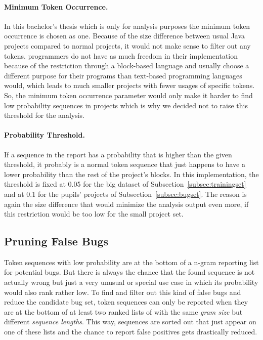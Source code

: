 \paragraph{Minimum Token Occurrence.}
In this bachelor's thesis \ngram{} which is only for \scratch{} analysis purposes the minimum token occurrence is chosen as one. Because of the size difference between usual Java projects compared to normal \scratch{} projects, it would not make sense to filter out any tokens. \scratch{} programmers do not have as much freedom in their implementation because of the restriction through a block-based language and usually choose a different purpose for their programs than text-based programming languages would, which leads to much smaller projects with fewer usages of specific tokens. So, the minimum token occurrence parameter would only make it harder to find low probability sequences in projects which is why we decided not to raise this threshold for the analysis.
\paragraph{Probability Threshold.}
If a sequence in the report has a probability that is higher than the given threshold, it probably is a normal token sequence that just happens to have a lower probability than the rest of the project's blocks. In this implementation, the threshold is fixed at 0.05 for the big dataset of Subsection~\ref{subsec:trainingset} and at 0.1 for the pupils' projects of Subsection~\ref{subsec:bugset}. The reason is again the size difference that would minimize the analysis output even more, if this restriction would be too low for the small project set.

\subsection{Pruning False Bugs}\label{subsec:false_bugs}
Token sequences with low probability are at the bottom of a n-gram reporting list for potential bugs. But there is always the chance that the found sequence is not actually wrong but just a very unusual or special use case in which its probability would also rank rather low. To find and filter out this kind of false bugs and reduce the candidate bug set, token sequences can only be reported when they are at the bottom of at least two ranked lists of  with the same \textit{gram size} but different \textit{sequence lengths}. This way, sequences are sorted out that just appear on one of these lists and the chance to report false positives gets drastically reduced. 


